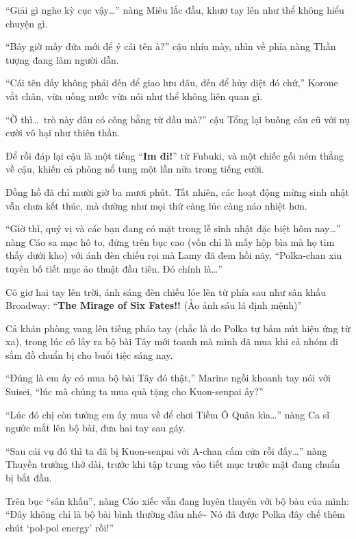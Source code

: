 \documentclass[../main.tex]{subfiles}
\begin{document}
``Giải gì nghe kỳ cục vậy\dots'' nàng Miêu lắc đầu, khươ tay lên như thể không hiểu chuyện gì.

``Bây giờ mấy đứa mới để ý cái tên à?'' cậu nhíu mày, nhìn về phía nàng Thần tượng đang làm người dẫn.

``Cái tên đấy không phải đến để giao lưu đâu, đến để hủy diệt đó chứ,'' Korone vắt chân, vừa uống nước vừa nói như thể không liên quan gì.

``Ờ thì\dots\ trò này đâu có công bằng từ đầu mà?'' cậu Tổng lại buông câu cũ với nụ cười vô hại như thiên thần.

Để rồi đáp lại cậu là một tiếng ``\textbf{Im đi!}'' từ Fubuki, và một chiếc gối ném thẳng về cậu, khiến cả phòng nổ tung một lần nữa trong tiếng cười.

\ct

Đồng hồ đã chỉ mười giờ ba mươi phút. Tất nhiên, các hoạt động mừng sinh nhật vẫn chưa kết thúc, mà dường như mọi thứ càng lúc càng náo nhiệt hơn.

``Giờ thì, quý vị và các bạn đang có mặt trong lễ sinh nhật đặc biệt hôm nay\dots'' nàng Cáo sa mạc hô to, đứng trên bục cao (vốn chỉ là mấy hộp bìa mà họ tìm thấy dưới kho) với ánh đèn chiếu rọi mà Lamy đã đem hồi nãy, ``Polka-chan xin tuyên bố tiết mục ảo thuật đầu tiên. Đó chính là\dots''

Cô giơ hai tay lên trời, ánh sáng đèn chiếu lóe lên từ phía sau như sân khấu Broadway: ``\textbf{The Mirage of Six Fates!!} (Ảo ảnh sáu lá định mệnh)''

Cả khán phòng vang lên tiếng pháo tay (chắc là do Polka tự bấm nút hiệu ứng từ xa), trong lúc cô lấy ra bộ bài Tây mới toanh mà mình đã mua khi cả nhóm đi sắm đồ chuẩn bị cho buổi tiệc sáng nay.

``Đúng là em ấy có mua bộ bài Tây đó thật,'' Marine ngồi khoanh tay nói với Suisei, ``lúc mà chúng ta mua quà tặng cho Kuon-senpai ấy?''

``Lúc đó chị còn tưởng em ấy mua về để chơi Tiềm Ô Quân kìa\dots'' nàng Ca sĩ ngước mắt lên bộ bài, đưa hai tay sau gáy.

``Sau cái vụ đó thì ta đã bị Kuon-senpai với A-chan cấm cửa rồi đấy\dots'' nàng Thuyền trưởng thở dài, trước khi tập trung vào tiết mục trước mặt đang chuẩn bị bắt đầu.

Trên bục ``sân khấu'', nàng Cáo xiếc vẫn đang luyên thuyên với bộ bàu của mình: ``Đây không chỉ là bộ bài bình thường đâu nhé\~{} Nó đã được Polka đây chế thêm chút `pol-pol energy' rồi!''
\end{document}
